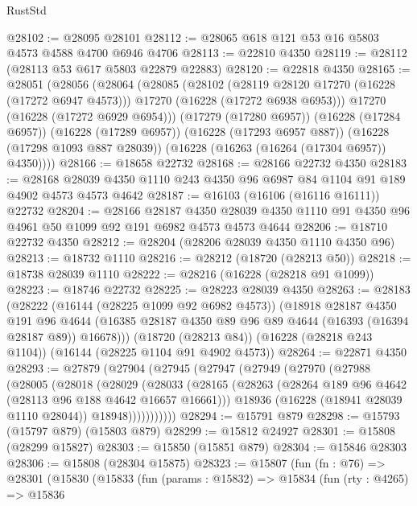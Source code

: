 \begin{lexlean}{RustStd}
\begin{coremodule}
@28102 := @28095 @28101
@28112 := @28065 @618 @121 @53 @16 @5803 @4573 @4588 @4700 @6946 @4706
@28113 := @22810 @4350
@28119 := @28112 (@28113 @53 @617 @5803 @22879 @22883)
@28120 := @22818 @4350
@28165 := @28051
    (@28056
      (@28064
        (@28085
          (@28102
            (@28119 @28120 @17270 (@16228 (@17272 @6947 @4573)))
            @17270
            (@16228 (@17272 @6938 @6953)))
          @17270
          (@16228 (@17272 @6929 @6954)))
        (@17279 (@17280 @6957))
        (@16228 (@17284 @6957))
        (@16228 (@17289 @6957))
        (@16228 (@17293 @6957 @887))
        (@16228 (@17298 @1093 @887 @28039))
        (@16228 (@16263 (@16264 (@17304 @6957)) @4350))))
@28166 := @18658 @22732
@28168 := @28166 @22732 @4350
@28183 := @28168 @28039 @4350 @1110 @243 @4350 @96 @6987 @84 @1104 @91 @189 @4902 @4573 @4573 @4642
@28187 := @16103 (@16106 (@16116 @16111)) @22732
@28204 := @28166
    @28187
    @4350
    @28039
    @4350
    @1110
    @91
    @4350
    @96
    @4961
    @50
    @1099
    @92
    @191
    @6982
    @4573
    @4573
    @4644
@28206 := @18710 @22732 @4350
@28212 := @28204 (@28206 @28039 @4350 @1110 @4350 @96)
@28213 := @18732 @1110
@28216 := @28212 (@18720 (@28213 @50))
@28218 := @18738 @28039 @1110
@28222 := @28216 (@16228 (@28218 @91 @1099))
@28223 := @18746 @22732
@28225 := @28223 @28039 @4350
@28263 := @28183
    (@28222
      (@16144 (@28225 @1099 @92 @6982 @4573))
      (@18918
        @28187
        @4350
        @191
        @96
        @4644
        (@16385 @28187 @4350 @89 @96 @89 @4644 (@16393 (@16394 @28187 @89)) @16678)))
    (@18720 (@28213 @84))
    (@16228 (@28218 @243 @1104))
    (@16144 (@28225 @1104 @91 @4902 @4573))
@28264 := @22871 @4350
@28293 := @27879
    (@27904
      (@27945
        (@27947
          (@27949
            (@27970
              (@27988
                (@28005
                  (@28018
                    (@28029
                      (@28033
                        (@28165
                          (@28263 (@28264 @189 @96 @4642 (@28113 @96 @188 @4642 @16657 @16661)))
                          @18936
                          (@16228 (@18941 @28039 @1110 @28044))
                          @18948)))))))))))
@28294 := @15791 @879
@28298 := @15793 (@15797 @879) (@15803 @879)
@28299 := @15812 @24927
@28301 := @15808 (@28299 @15827)
@28303 := @15850 (@15851 @879)
@28304 := @15846 @28303
@28306 := @15808 (@28304 @15875)
@28323 := @15807
    (fun (fn : @76) =>
    @28301
      (@15830
        (@15833
          (fun (params : @15832) =>
          @15834
            (fun (rty : @4265) =>
            @15836

\end{coremodule}
\end{lexlean}
